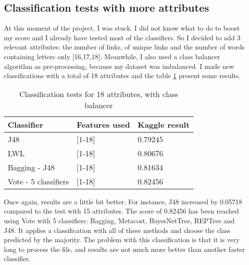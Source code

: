 \documentclass[runningheads]{llncs}
\begin{document}
\subsection{Classification tests with more attributes}
%
At this moment of the project, I was stuck. I did not know what to do to boost my score and I already have tested most of the classifiers. So I decided to add 3 relevant attributes: the number of links, of unique links and the number of words containing letters only [16,17,18]. Meanwhile, I also used a class balancer algorithm as pre-processing, because my dataset was imbalanced. I made new classifications with a total of 18 attributes and the table \ref{tab4} present some results. \par
%
\begin{table}
\caption{Classification tests for 18 attributes, with class balancer}\label{tab4}
\centering
\begin{tabular}{|l|l|l|}
\hline
Classifier & Features used & Kaggle result \\
\hline \hline
J48 & [1-18] & 0.79245 \\\hline
LWL & [1-18] & 0.80676 \\\hline
Bagging - J48 & [1-18] & 0.81634 \\\hline
Vote - 5 classifiers & [1-18] & 0.82456 \\
\hline
\end{tabular}
\end{table}
%
Once again, results are a little bit better. For instance, J48 increased by 0.05718 compared to the test with 15 attributes. The score of 0.82456 has been reached using Vote with 5 classifiers: Bagging, Metacost, BayesNetTree, REPTree and J48. It applies a classification with all of these methods and choose the class predicted by the majority. The problem with this classification is that it is very long to process the file, and results are not much more better than another faster classifier.
%
\end{document}
